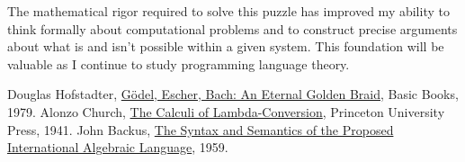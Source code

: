 \documentclass{article}
\theoremstyle{plain}
\theoremstyle{definition}
\theoremstyle{remark}
\begin{document}
The mathematical rigor required to solve this puzzle has improved my ability to think formally about computational problems and to construct precise arguments about what is and isn't possible within a given system. This foundation will be valuable as I continue to study programming language theory.

\begin{thebibliography}{99}
 Douglas Hofstadter, \href{https://en.wikipedia.org/wiki/G%C3%B6del,_Escher,_Bach}{Gödel, Escher, Bach: An Eternal Golden Braid}, Basic Books, 1979.
 Alonzo Church, \href{https://en.wikipedia.org/wiki/Lambda_calculus}{The Calculi of Lambda-Conversion}, Princeton University Press, 1941.
 John Backus, \href{https://en.wikipedia.org/wiki/Backus%E2%80%93Naur_form}{The Syntax and Semantics of the Proposed International Algebraic Language}, 1959.
\end{thebibliography}
\end{document}
